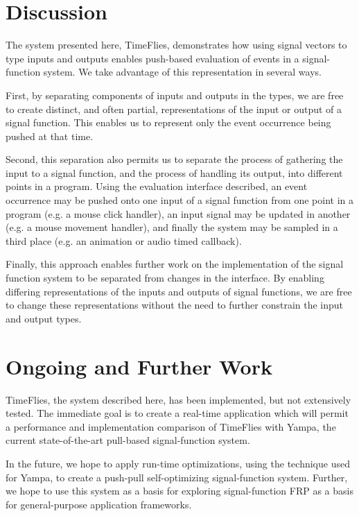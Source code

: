 \documentclass[draft]{llncs}
\begin{document}
\section{Discussion}
\label{section:Discussion}

The system presented here, TimeFlies, demonstrates how using signal vectors
to type inputs and outputs enables push-based evaluation of events in a
signal-function system. We take advantage of this representation in several ways.

First, by separating components of inputs and outputs in the types, we are free
to create distinct, and often partial, representations of the input or output
of a signal function. This enables us to represent only the event occurrence
being pushed at that time.

Second, this separation also permits us to separate the process of gathering
the input to a signal function, and the process of handling its output, into
different points in a program. Using the evaluation interface described, an
event occurrence may be pushed onto one input of a signal function from one
point in a program (e.g. a mouse click handler), an input signal
may be updated in another (e.g. a mouse movement handler), and finally the
system may be sampled in a third place (e.g. an animation or audio timed
callback).

Finally, this approach enables further work on the implementation of the signal
function system to be separated from changes in the interface. By enabling
differing representations of the inputs and outputs of signal functions, we are
free to change these representations without the need to further constrain the
input and output types.

\section{Ongoing and Further Work}
\label{section:Ongoing_and_Further_Work}

TimeFlies, the system described here, has been implemented, but not
extensively tested. The immediate goal is to create a real-time application
which will permit a performance and implementation comparison of TimeFlies with
Yampa, the current state-of-the-art pull-based signal-function system.

In the future, we hope to apply run-time optimizations, using the technique used
for Yampa, to create a push-pull self-optimizing signal-function system. Further,
we hope to use this system as a basis for exploring signal-function FRP as a
basis for general-purpose application frameworks.
\end{document}
